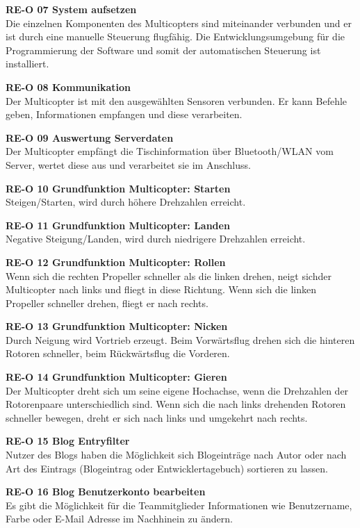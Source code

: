   \textbf{RE-O 07 System aufsetzen}\\
  Die einzelnen Komponenten des Multicopters sind miteinander verbunden und er ist
  durch eine manuelle Steuerung flugfähig. Die Entwicklungsumgebung für die
  Programmierung der Software und somit der automatischen Steuerung ist installiert.

  \textbf{RE-O 08 Kommunikation}\\
  Der Multicopter ist mit den ausgewählten Sensoren verbunden. Er kann Befehle geben,
  Informationen empfangen und diese verarbeiten.

  \textbf{RE-O 09 Auswertung Serverdaten}\\
  Der Multicopter empfängt die Tischinformation über Bluetooth/WLAN vom Server,
  wertet diese aus und verarbeitet sie im Anschluss.

  \textbf{RE-O 10 Grundfunktion Multicopter: Starten}\\
  Steigen/Starten, wird durch höhere Drehzahlen erreicht.

  \textbf{RE-O 11 Grundfunktion Multicopter: Landen}\\
  Negative Steigung/Landen, wird durch niedrigere Drehzahlen erreicht.

  \textbf{RE-O 12 Grundfunktion Multicopter: Rollen}\\
  Wenn sich die rechten Propeller schneller als die linken drehen, neigt sichder
  Multicopter nach links und fliegt in diese Richtung. Wenn sich die linken Propeller
  schneller drehen, fliegt er nach rechts.

  \textbf{RE-O 13 Grundfunktion Multicopter: Nicken}\\
  Durch Neigung wird Vortrieb erzeugt. Beim Vorwärtsflug drehen sich die hinteren
  Rotoren schneller, beim Rückwärtsflug die Vorderen.

  \textbf{RE-O 14 Grundfunktion Multicopter: Gieren}\\
  Der Multicopter dreht sich um seine eigene Hochachse, wenn die Drehzahlen der
  Rotorenpaare unterschiedlich sind. Wenn sich die nach links drehenden Rotoren schneller
  bewegen, dreht er sich nach links und umgekehrt nach rechts.

  \textbf{RE-O 15 Blog Entryfilter}\\
  Nutzer des Blogs haben die Möglichkeit sich Blogeinträge nach Autor oder nach
  Art des Eintrags (Blogeintrag oder Entwicklertagebuch) sortieren zu lassen.

  \textbf{RE-O 16 Blog Benutzerkonto bearbeiten}\\
  Es gibt die Möglichkeit für die Teammitglieder Informationen wie Benutzername,
  Farbe oder E-Mail Adresse im Nachhinein zu ändern.

